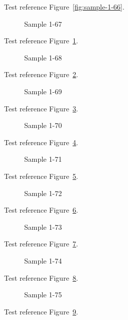 Test reference Figure~\ref{fig:sample-1-66}.

\begin{figure}[tbhp]
\caption{Sample 1-67}
\label{fig:sample-1-67}
\end{figure}

Test reference Figure~\ref{fig:sample-1-67}.

\begin{figure}[tbhp]
\caption{Sample 1-68}
\label{fig:sample-1-68}
\end{figure}

Test reference Figure~\ref{fig:sample-1-68}.

\begin{figure}[tbhp]
\caption{Sample 1-69}
\label{fig:sample-1-69}
\end{figure}

Test reference Figure~\ref{fig:sample-1-69}.

\begin{figure}[tbhp]
\caption{Sample 1-70}
\label{fig:sample-1-70}
\end{figure}

Test reference Figure~\ref{fig:sample-1-70}.

\begin{figure}[tbhp]
\caption{Sample 1-71}
\label{fig:sample-1-71}
\end{figure}

Test reference Figure~\ref{fig:sample-1-71}.

\begin{figure}[tbhp]
\caption{Sample 1-72}
\label{fig:sample-1-72}
\end{figure}

Test reference Figure~\ref{fig:sample-1-72}.

\begin{figure}[tbhp]
\caption{Sample 1-73}
\label{fig:sample-1-73}
\end{figure}

Test reference Figure~\ref{fig:sample-1-73}.

\begin{figure}[tbhp]
\caption{Sample 1-74}
\label{fig:sample-1-74}
\end{figure}

Test reference Figure~\ref{fig:sample-1-74}.

\begin{figure}[tbhp]
\caption{Sample 1-75}
\label{fig:sample-1-75}
\end{figure}

Test reference Figure~\ref{fig:sample-1-75}.

